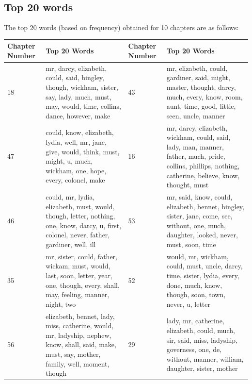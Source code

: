 \documentclass{article}
\begin{document}
\subsection{Top 20 words}
\begin{flushleft}
	The top 20 words (based on frequency) obtained for 10 chapters are as follows:
	\begin{center}
		\begin{tabular}{|p{}|p{}||p{}|p{}|}
			\hline
			Chapter Number & Top 20 Words & Chapter Number & Top 20 Words \\
			\hline
			\hline
			18 & mr, darcy, elizabeth, could, said, bingley, though, wickham, sister, say, lady, much, must, may, would, time, collins, dance, however, make &
			43 & mr, elizabeth, could, gardiner, said, might, master, thought, darcy, much, every, know, room, aunt, time, good, little, seen, uncle, manner \\ 
			\hline
			47 & could, know, elizabeth, lydia, well, mr, jane, give, would, think, must, might, u, much, wickham, one, hope, every, colonel, make  &
			16 & mr, darcy, elizabeth, wickham, could, said, lady, man, manner, father, much, pride, collins, phillips, nothing, catherine, believe, know, thought, must \\
			\hline
			46 & could, mr, lydia, elizabeth, must, would, though, letter, nothing, one, know, darcy, u, first, colonel, never, father, gardiner, well, ill &
			53 & mr, said, know, could, elizabeth, bennet, bingley, sister, jane, come, see, without, one, much, daughter, looked, never, must, soon, time \\
			\hline
			35 & mr, sister, could, father,  wickam, must, would, last, soon, letter, year, one, though, every, shall, may, feeling, manner, night, two  &
			52 & would, mr, wickham, could, must, uncle, darcy, time, sister, lydia, every, done, much, know, though, soon, town, never, u, letter  \\
			\hline
			56 & elizabeth, bennet, lady, miss, catherine, would, mr, ladyship, nephew, know, shall, said, make, must, say, mother, family, well, moment, though &
			29 & lady, mr, catherine, elizabeth, could, much, sir, said, miss, ladyship, governess, one, de, without, manner, william, daughter, sister, mother \\
			\hline
		\end{tabular}
	\end{center}
\end{flushleft}
\newpage
\end{document}

